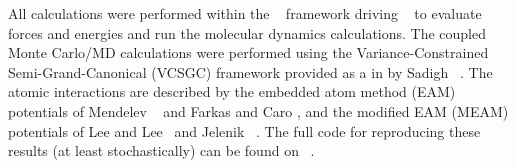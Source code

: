 All calculations were performed within the ~\cite{pyiron, pyiron-paper} framework driving ~\cite{lammps, plimpton1995fast} to evaluate forces and energies and run the molecular dynamics calculations.
The coupled Monte Carlo/MD calculations were performed using the Variance-Constrained Semi-Grand-Canonical (VCSGC) framework provided as a  in  by Sadigh \etal~\cite{sadigh2012calculation, sadigh2012scalable}.
The atomic interactions are described by the embedded atom method (EAM) potentials of Mendelev \etal~\cite{mendelev2005effect} and Farkas and Caro \cite{farkas2020model}, and the modified EAM (MEAM) potentials of Lee and Lee~\cite{lee2010modified} and Jelenik \etal~\cite{jelinek2012modified}.
The full code for reproducing these results (at least stochastically) can be found on ~\cite{feal}.
